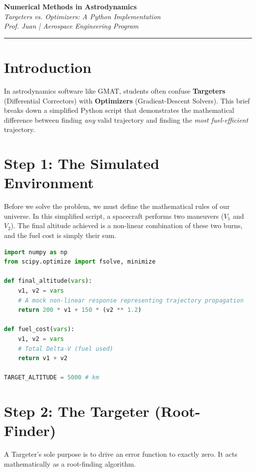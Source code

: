 \documentclass[11pt, letterpaper]{article}
\begin{document}
\begin{center} 
    {\Large \textbf{Numerical Methods in Astrodynamics}} \\ 
    \vspace{0.2cm} 
    {\large \textit{Targeters vs. Optimizers: A Python Implementation}} \\ 
    \vspace{0.4cm} 
    \textit{Prof. Juan | Aerospace Engineering Program} 
\end{center} 
\hrule \vspace{0.5cm} 

\section*{Introduction}
In astrodynamics software like GMAT, students often confuse \textbf{Targeters} (Differential Correctors) with \textbf{Optimizers} (Gradient-Descent Solvers). This brief breaks down a simplified Python script that demonstrates the mathematical difference between finding \textit{any} valid trajectory and finding the \textit{most fuel-efficient} trajectory.

\section*{Step 1: The Simulated Environment}
Before we solve the problem, we must define the mathematical rules of our universe. In this simplified script, a spacecraft performs two maneuvers ($V_1$ and $V_2$). The final altitude achieved is a non-linear combination of these two burns, and the fuel cost is simply their sum.

\begin{lstlisting}[language=Python]
import numpy as np
from scipy.optimize import fsolve, minimize

def final_altitude(vars):
    v1, v2 = vars
    # A mock non-linear response representing trajectory propagation
    return 200 * v1 + 150 * (v2 ** 1.2) 

def fuel_cost(vars):
    v1, v2 = vars
    # Total Delta-V (fuel used)
    return v1 + v2

TARGET_ALTITUDE = 5000 # km
\end{lstlisting}

\section*{Step 2: The Targeter (Root-Finder)}
A Targeter's sole purpose is to drive an error function to exactly zero. It acts mathematically as a root-finding algorithm. 
\end{document}
